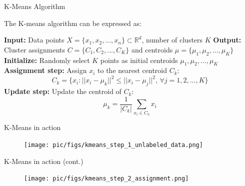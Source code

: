 \documentclass[serif, aspectratio=169]{beamer}
\begin{document}
\begin{frame}{K-Means Algorithm}
    \begin{itemize}
        The K-means algorithm can be expressed as:
    \end{itemize}
    
\begin{algorithm}
\caption{K-means Clustering Algorithm}
\begin{algorithmic}[1]
\State \textbf{Input:} Data points $X = \{x_1, x_2, ..., x_n\} \subset \mathbb{R}^d$, number of clusters $K$
\State \textbf{Output:} Cluster assignments $C = \{C_1, C_2, ..., C_K\}$ and centroids $\mu = \{\mu_1, \mu_2, ..., \mu_K\}$
\State \textbf{Initialize:} Randomly select $K$ points as initial centroids $\mu_1, \mu_2, ..., \mu_K$
\Repeat
    \State \textbf{Assignment step:}
        \State Assign $x_i$ to the nearest centroid $C_k$: 
        \[
        C_k = \{ x_i : ||x_i - \mu_k||^2 \leq ||x_i - \mu_j||^2, \, \forall j = 1, 2, ..., K \}
        \]
    \EndFor
    \State \textbf{Update step:}
        \State Update the centroid of $C_k$: 
        \[
        \mu_k = \frac{1}{|C_k|} \sum_{x_i \in C_k} x_i
        \]
    \EndFor
{}
\end{algorithmic}
\end{algorithm}
\end{frame}

\begin{frame}{K-Means in action}
    \begin{figure}
        \centering
        \texttt{[image: pic/figs/kmeans\_step\_1\_unlabeled\_data.png]}
    \end{figure}
\end{frame}
\begin{frame}{K-Means in action (cont.)}
    \begin{figure}
        \centering
        \texttt{[image: pic/figs/kmeans\_step\_2\_assignment.png]}
    \end{figure}
\end{frame}
\end{document}
